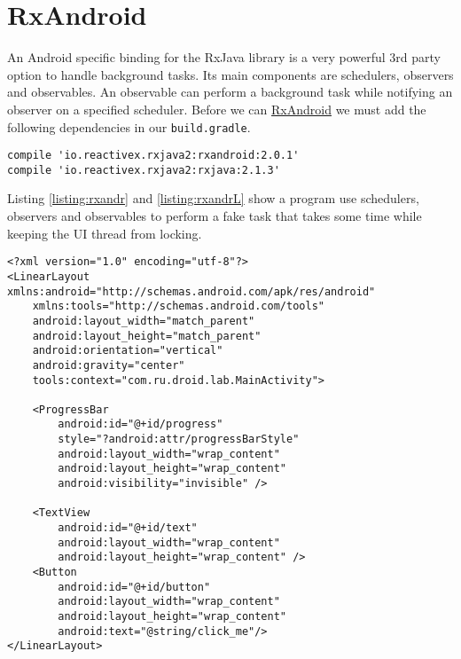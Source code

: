 \section{RxAndroid}
An Android specific binding for the RxJava library is a very powerful 3rd party option to handle background tasks. Its main components are schedulers, observers and observables. An observable can perform a background task while notifying an observer on a specified scheduler. Before we can \href{https://github.com/ReactiveX/RxAndroid}{RxAndroid} we must add the following dependencies in our \texttt{build.gradle}.

\begin{lstlisting}[style=A_txt]
compile 'io.reactivex.rxjava2:rxandroid:2.0.1'
compile 'io.reactivex.rxjava2:rxjava:2.1.3'
\end{lstlisting}

Listing \ref{listing:rxandr} and \ref{listing:rxandrL} show a program use schedulers, observers and observables to perform a fake task that takes some time while keeping the UI thread from locking. 

\begin{lstlisting}[style=A_XML, caption={Layout for RxAndroid example}, label={listing:rxandrL}]
<?xml version="1.0" encoding="utf-8"?>
<LinearLayout xmlns:android="http://schemas.android.com/apk/res/android"
    xmlns:tools="http://schemas.android.com/tools"
    android:layout_width="match_parent"
    android:layout_height="match_parent"
    android:orientation="vertical"
    android:gravity="center"
    tools:context="com.ru.droid.lab.MainActivity">

    <ProgressBar
        android:id="@+id/progress"
        style="?android:attr/progressBarStyle"
        android:layout_width="wrap_content"
        android:layout_height="wrap_content"
        android:visibility="invisible" />

    <TextView
        android:id="@+id/text"
        android:layout_width="wrap_content"
        android:layout_height="wrap_content" />
    <Button
        android:id="@+id/button"
        android:layout_width="wrap_content"
        android:layout_height="wrap_content"
        android:text="@string/click_me"/>
</LinearLayout>
\end{lstlisting}

